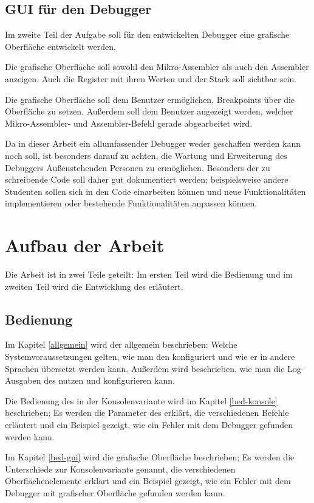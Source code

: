 \subsection*{GUI für den Debugger}
Im zweite Teil der Aufgabe soll für den entwickelten Debugger eine grafische  Oberfläche entwickelt werden.

Die grafische Oberfläche soll sowohl den Mikro-Assembler als auch den Assembler anzeigen. Auch die Register mit ihren Werten und der Stack soll sichtbar sein.

Die grafische Oberfläche soll dem Benutzer ermöglichen, Breakpoints über die Oberfläche zu setzen. Außerdem soll dem Benutzer angezeigt werden, welcher Mikro-Assembler- und Assembler-Befehl gerade abgearbeitet wird.

Da in dieser Arbeit ein allumfassender Debugger weder geschaffen werden kann noch soll, ist besonders darauf zu achten, die Wartung und Erweiterung des Debuggers Außenstehenden Personen zu ermöglichen. Besonders der zu schreibende Code soll daher gut dokumentiert werden; beispielsweise andere Studenten sollen sich in den Code einarbeiten können und neue Funktionalitäten implementieren oder bestehende Funktionalitäten anpassen können.

\section*{Aufbau der Arbeit}
Die Arbeit ist in zwei Teile geteilt: Im ersten Teil wird die Bedienung und im zweiten Teil wird die Entwicklung des \md{} erläutert.

\subsection*{Bedienung}
Im Kapitel \ref{allgemein} wird der \md{} allgemein beschrieben: Welche Systemvoraussetzungen gelten, wie man den \md{} konfiguriert und wie er in andere Sprachen übersetzt werden kann. Außerdem wird beschrieben, wie man die Log-Ausgaben des \md{} nutzen und konfigurieren kann.

Die Bedienung des \md{} in der Konsolenvariante wird im Kapitel \ref{bed-konsole} beschrieben; Es werden die Parameter des \md{} erklärt, die verschiedenen Befehle erläutert und ein Beispiel gezeigt, wie ein Fehler mit dem Debugger gefunden werden kann.

Im Kapitel \ref{bed-gui} wird die grafische Oberfläche beschrieben; Es werden die Unterschiede zur Konsolenvariante genannt, die verschiedenen Oberflächenelemente erklärt und ein Beispiel gezeigt, wie ein Fehler mit dem Debugger mit grafischer Oberfläche gefunden werden kann.

